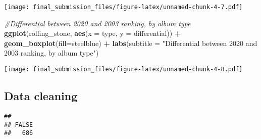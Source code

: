 \documentclass[
]{article}
\newenvironment{Shaded}{\begin{snugshade}}{\end{snugshade}}
\newcommand{\AttributeTok}[1]{\textcolor[rgb]{0.13,0.29,0.53}{#1}}
\newcommand{\CommentTok}[1]{\textcolor[rgb]{0.56,0.35,0.01}{\textit{#1}}}
\newcommand{\DecValTok}[1]{\textcolor[rgb]{0.00,0.00,0.81}{#1}}
\newcommand{\FunctionTok}[1]{\textcolor[rgb]{0.13,0.29,0.53}{\textbf{#1}}}
\newcommand{\NormalTok}[1]{#1}
\newcommand{\OtherTok}[1]{\textcolor[rgb]{0.56,0.35,0.01}{#1}}
\newcommand{\SpecialCharTok}[1]{\textcolor[rgb]{0.81,0.36,0.00}{\textbf{#1}}}
\newcommand{\StringTok}[1]{\textcolor[rgb]{0.31,0.60,0.02}{#1}}
\begin{document}
\texttt{[image: final\_submission\_files/figure-latex/unnamed-chunk-4-7.pdf]}

\begin{Shaded}
\begin{Highlighting}[]
\CommentTok{\#Differential between 2020 and 2003 ranking, by album type}
\FunctionTok{ggplot}\NormalTok{(rolling\_stone, }\FunctionTok{aes}\NormalTok{(}\AttributeTok{x =}\NormalTok{ type, }\AttributeTok{y =}\NormalTok{ differential)) }\SpecialCharTok{+}
  \FunctionTok{geom\_boxplot}\NormalTok{(}\AttributeTok{fill=}\StringTok{\textquotesingle{}steelblue\textquotesingle{}}\NormalTok{) }\SpecialCharTok{+}
  \FunctionTok{labs}\NormalTok{(}\AttributeTok{subtitle =} \StringTok{"Differential between 2020 and 2003 ranking, by album type"}\NormalTok{)}
\end{Highlighting}
\end{Shaded}

\texttt{[image: final\_submission\_files/figure-latex/unnamed-chunk-4-8.pdf]}

\subsection{Data cleaning}\label{data-cleaning}

\begin{Shaded}
\end{Shaded}

\begin{verbatim}
## 
## FALSE 
##   686
\end{verbatim}
\end{document}
